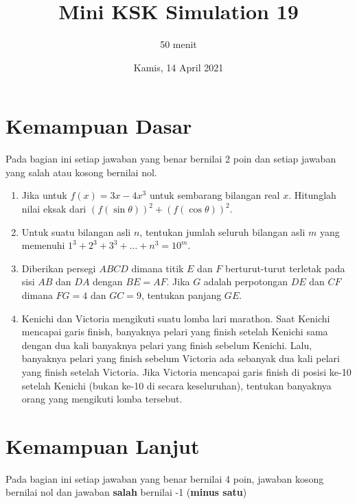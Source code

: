 \documentclass{article}
\title{Mini KSK Simulation 19}
\author{50 menit}
\date{Kamis, 14 April 2021}
\begin{document}
	\maketitle
	
	\section{Kemampuan Dasar}
	Pada bagian ini setiap jawaban yang benar bernilai 2 poin dan setiap jawaban yang salah
	atau kosong bernilai nol.
	\begin{enumerate}
		\item Jika untuk $f(x)=3x-4x^3$ untuk sembarang bilangan real $x$. Hitunglah nilai eksak dari $(f(\sin \theta))^2+(f(\cos \theta))^2$.
		
		\item Untuk suatu bilangan asli $n$, tentukan jumlah seluruh bilangan asli $m$ yang memenuhi $1^3+2^3+3^3+\dots+n^3=10^m$.
		
		\item Diberikan persegi $ABCD$ dimana titik $E$ dan $F$ berturut-turut terletak pada sisi $AB$ dan $DA$ dengan $BE=AF$. Jika $G$ adalah perpotongan $DE$ dan $CF$ dimana $FG=4$ dan $GC=9$, tentukan panjang $GE$.
		
		\item Kenichi dan Victoria mengikuti suatu lomba lari marathon. Saat Kenichi mencapai garis finish, banyaknya pelari yang finish setelah Kenichi sama dengan dua kali banyaknya pelari yang finish sebelum Kenichi. Lalu, banyaknya pelari yang finish sebelum Victoria ada sebanyak dua kali pelari yang finish setelah Victoria. Jika Victoria mencapai garis finish di posisi ke-10 setelah Kenichi (bukan ke-10 di secara keseluruhan), tentukan banyaknya orang yang mengikuti lomba tersebut.
	\end{enumerate}

\section{Kemampuan Lanjut}
Pada bagian ini setiap jawaban yang benar bernilai 4 poin, jawaban kosong bernilai nol
dan jawaban \textbf{salah} bernilai -1 (\textbf{minus satu})
\end{document}
